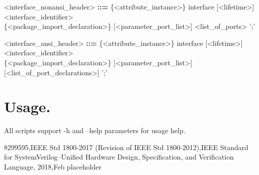 \documentclass{article}
\begin{document}
\begin{grammar}
<interface_nonansi_header> \textbf{::=} \{<attribute_instance>\} interface [<lifetime>] <interface_identifier> \\
                                        \{<package_import_declaration>\} [<parameter_port_list>] <list_of_ports> ';'
\end{grammar}
\begin{grammar}
<interface_ansi_header> \textbf{::=} \{<attribute_instance>\} interface [<lifetime>] <interface_identifier> \\
                                     \{<package_import_declaration>\} [<parameter_port_list>] [<list_of_port_declarations>] ';'
\end{grammar}


%


\section{Usage.}
{ All scripts support -h and --help parameters for usage help.}

\begin{thebibliography}{9}
8299595,IEEE Std 1800-2017 (Revision of IEEE Std 1800-2012),IEEE Standard for SystemVerilog--Unified Hardware Design, Specification, and Verification Language,
2018,Feb
placeholder

\end{thebibliography}
\end{document}
